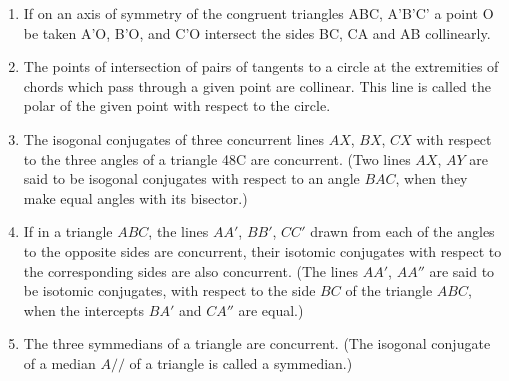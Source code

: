 \begin{enumerate}
\begin{enumerate}[(1)]
        \item If on an axis of symmetry of the congruent triangles ABC, A'B'C' a
            point O be taken A’O, B’O, and C’O intersect the sides BC, CA and AB
            collinearly.

        \item The points of intersection of pairs of tangents to a circle at the
            extremities of chords which pass through a given point are collinear.
            This line is called the polar of the given point with respect to the 
            circle.

        \item The isogonal conjugates of three concurrent lines $AX$, $BX$, $CX$
            with respect to the three angles of a triangle 48C are concurrent.
            (Two lines $AX$, $AY$ are said to be isogonal conjugates with 
            respect to an angle $BAC$, when they make equal angles with its 
            bisector.)

        \item If in a triangle $ABC$, the lines $AA'$, $BB'$, $CC'$ drawn from
            each of the angles to the opposite sides are concurrent, their
            isotomic conjugates with respect to the corresponding sides are also
            concurrent. (The lines $AA'$, $AA''$ are said to be isotomic
            conjugates, with respect to the side $BC$ of the triangle $ABC$,
            when the intercepts $BA'$ and $CA''$ are equal.)

        \item The three symmedians of a triangle are concurrent. (The isogonal
            conjugate of a median $A//$ of a triangle is called a symmedian.)

    \end{enumerate}

\end{enumerate}


